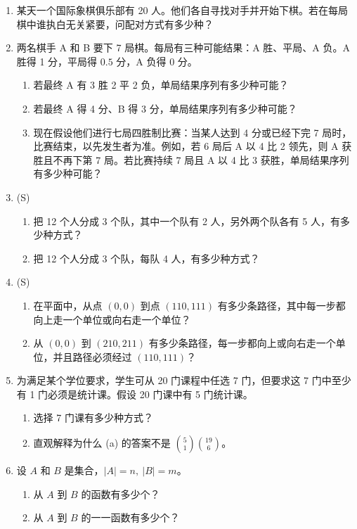 \documentclass[UTF8,12pt,a4paper,fontset=fandol]{ctexart}
\begin{document}
\begin{enumerate}
  \item 某天一个国际象棋俱乐部有 20 人。他们各自寻找对手并开始下棋。若在每局棋中谁执白无关紧要，问配对方式有多少种？

  \item 两名棋手 A 和 B 要下 7 局棋。每局有三种可能结果：A 胜、平局、A 负。A 胜得 1 分，平局得 $0.5$ 分，A 负得 0 分。
  \begin{enumerate}
    \item 若最终 A 有 3 胜 2 平 2 负，单局结果序列有多少种可能？
    \item 若最终 A 得 4 分、B 得 3 分，单局结果序列有多少种可能？
    \item 现在假设他们进行七局四胜制比赛：当某人达到 4 分或已经下完 7 局时，比赛结束，以先发生者为准。例如，若 6 局后 A 以 4 比 2 领先，则 A 获胜且不再下第 7 局。若比赛持续 7 局且 A 以 4 比 3 获胜，单局结果序列有多少种可能？
  \end{enumerate}

  \item (S)
  \begin{enumerate}
    \item 把 12 个人分成 3 个队，其中一个队有 2 人，另外两个队各有 5 人，有多少种方式？
    \item 把 12 个人分成 3 个队，每队 4 人，有多少种方式？
  \end{enumerate}

  \item (S)
  \begin{enumerate}
    \item 在平面中，从点 $(0,0)$ 到点 $(110,111)$ 有多少条路径，其中每一步都向上走一个单位或向右走一个单位？
    \item 从 $(0,0)$ 到 $(210,211)$ 有多少条路径，每一步都向上或向右走一个单位，并且路径必须经过 $(110,111)$？
  \end{enumerate}

  \item 为满足某个学位要求，学生可从 20 门课程中任选 7 门，但要求这 7 门中至少有 1 门必须是统计课。假设 20 门课中有 5 门统计课。
  \begin{enumerate}
    \item 选择 7 门课有多少种方式？
    \item 直观解释为什么 (a) 的答案不是 $\binom51\binom{19}{6}$。
  \end{enumerate}

  \item 设 $A$ 和 $B$ 是集合，$|A|=n,\ |B|=m$。
  \begin{enumerate}
    \item 从 $A$ 到 $B$ 的函数有多少个？
    \item 从 $A$ 到 $B$ 的一一函数有多少个？
  \end{enumerate}


\end{enumerate}
\end{document}
